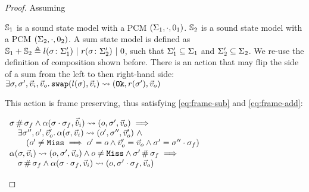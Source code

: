 \begin{proof}


Assuming
\begin{hypvlist}
 $\mathbb S_1$ is a sound state model with a PCM $(\Sigma_1, \cdot, 0_1)$.
 $\mathbb S_2$ is a sound state model with a PCM $(\Sigma_2, \cdot, 0_2)$.
 A sum state model is defined as $\mathbb S_1 + \mathbb S_2 \triangleq l(\sigma\colon \Sigma_1') ~|~ r(\sigma\colon \Sigma_2') ~|~ 0$, such that $\Sigma_1'\subseteq \Sigma_1$ and $\Sigma_2'\subseteq \Sigma_2$. We re-use the definition of composition shown before.
 There is an action \swap{} that may flip the side of a sum from the left to then right-hand side: $\exists\sigma,\sigma',\vec{v}_i,\vec{v}_o\ldotp \texttt{swap}(l(\sigma),\vec{v}_i)\rightsquigarrow(\texttt{Ok},r(\sigma'),\vec{v}_o)$
\end{hypvlist}

This \swap{} action is frame preserving, thus satisfying \ref{eq:frame-sub} and \ref{eq:frame-add}:
\begin{hypvlist}
	 $\begin{array}{l}
\sigma\operatorname{\#}\sigma_f \land \alpha(\sigma\cdot\sigma_f,\vec{\hat{v}}_i)\rightsquigarrow(o, \sigma',\vec{v}_o) \implies \\
\quad\exists \sigma'', o', \vec{v}_o'\ldotp \alpha(\sigma,\vec{v}_i)\rightsquigarrow(o', \sigma'', \vec{v}_o') ~\land \\
\qquad(o' \neq \texttt{Miss} \implies o' = o \land  \vec{v}_o' = \vec{v}_o \land \sigma' = \sigma'' \cdot \sigma_f)
	\end{array}$
	 $\begin{array}{l}
\alpha(\sigma,\vec{v}_i)\rightsquigarrow(o, \sigma', \vec{v}_o) \land o \neq \texttt{Miss} \land \sigma'\operatorname{\#}\sigma_f\implies\\
\quad\sigma \operatorname{\#} \sigma_f \land \alpha(\sigma\cdot\sigma_f, \vec{v}_i)\rightsquigarrow(o, \sigma'\cdot\sigma_f, \vec{v}_o)
	\end{array}$
\end{hypvlist}


\end{proof}
